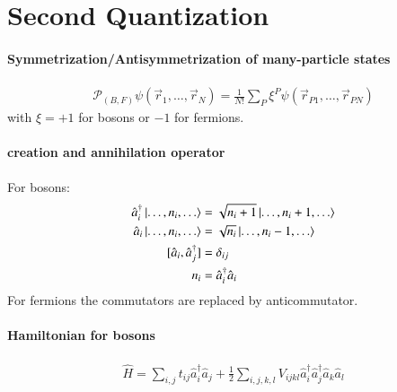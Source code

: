 \section{Second Quantization}
\paragraph{Symmetrization/Antisymmetrization of many-particle states}
\begin{align}
	\mathcal{P}_{(B,F)} \psi(\vec{r}_1, \dots, \vec{r}_N) = \frac{1}{N!}\sum_P \xi^P \psi(\vec{r}_{P1}, \dots, \vec{r}_{PN})
\end{align}
with $\xi = +1$ for bosons or $-1$ for fermions.

\paragraph{creation and annihilation operator}
For bosons:
\begin{align}
	\hat{a}_i^\dagger \ket{\dots, n_i, \dots} &= \sqrt{n_i + 1} \ket{\dots, n_i+1, \dots} \\
	\hat{a}_i \ket{\dots, n_i, \dots} &= \sqrt{n_i} \ket{\dots, n_i-1,\dots}\\
	[\hat{a}_i, \hat{a}_j^\dagger] &= \delta_{ij} \\
	n_i &= \hat{a}_i^\dagger \hat{a}_i
\end{align}
For fermions the commutators are replaced by anticommutator.

\paragraph{Hamiltonian for bosons}
\begin{align}
	\hat{H} = \sum_{i,j}t_{ij}\hat{a}^\dagger_i \hat{a}_j + \frac{1}{2} \sum_{i,j,k,l}V_{ijkl}\hat{a}^\dagger_i \hat{a}^\dagger_j \hat{a}_k \hat{a}_l	
\end{align}

